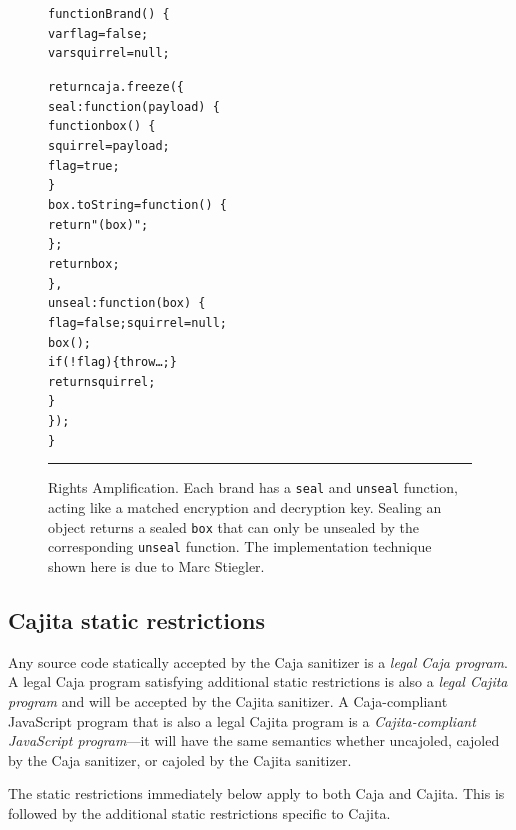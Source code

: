 \documentclass[letterpaper,twocolumn,10pt]{article}
\newcommand{\code}[1]{{\tt {#1}}}              %
\begin{document}
\begin{figure}[t!]
\begin{alltt}
function Brand()\ \{
  var flag = false;
  var squirrel = null;

  return caja.freeze(\{
    seal: function(payload)\ \{
      function box()\ \{
        squirrel = payload;
        flag = true;
      \}
      box.toString = function()\ \{
        return "(box)";
      \};
      return box;
    \},
    unseal: function(box)\ \{
      flag = false; squirrel = null;
      box();
      if (!flag) \{ throw {\ldots}; \}
      return squirrel;
    \}
  \});
\}
\end{alltt}

\caption[Rights Amplification]{Rights Amplification. Each brand has a 
\code{seal} and \code{unseal} function, acting like a matched encryption and 
decryption key. Sealing an object returns a sealed \code{box} that can only 
be unsealed by the corresponding \code{unseal} function. The implementation 
technique shown here is due to Marc Stiegler.
\\ } \hrule
\label{fig:rights-amp}
\end{figure}



\subsection{Cajita static restrictions}
\label{subsec:cajita-static}

Any source code statically accepted by the Caja sanitizer is a \emph{legal 
Caja program}. A legal Caja program satisfying additional static restrictions 
is also a \emph{legal Cajita program} and will be accepted by the Cajita 
sanitizer. A Caja-compliant JavaScript program that is also a legal Cajita 
program is a \emph{Cajita-compliant JavaScript program}---it will have the 
same semantics whether uncajoled, cajoled by the Caja sanitizer, or cajoled 
by the Cajita sanitizer.

The static restrictions immediately below apply to both Caja and Cajita. This 
is followed by the additional static restrictions specific to Cajita.
\end{document}
